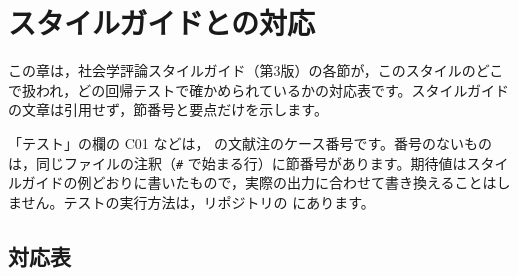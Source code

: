 \section{スタイルガイドとの対応}\label{sec:guidemap}
この章は，社会学評論スタイルガイド（第3版）の各節が，このスタイルのどこで扱われ，どの回帰テストで確かめられているかの対応表です。スタイルガイドの文章は引用せず，節番号と要点だけを示します。

「テスト」の欄の C01 などは， の文献注のケース番号です。番号のないものは，同じファイルの注釈（\texttt{\#} で始まる行）に節番号があります。期待値はスタイルガイドの例どおりに書いたもので，実際の出力に合わせて書き換えることはしません。テストの実行方法は，リポジトリの  にあります。

\subsection{対応表}
\begingroup\small
\setlength{\tabcolsep}{4pt}

